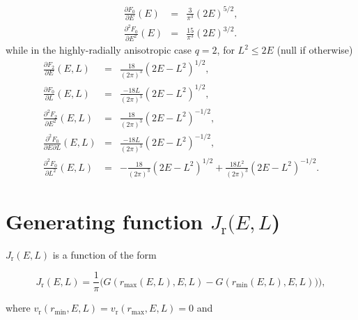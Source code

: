 \documentclass[11pt]{article}
\newcommand{\rr}{\mathrm{r}}
\newcommand{\vr}{v_{\rr}}
\newcommand{\rmax}{r_{\max}}
\newcommand{\rmin}{r_{\min}}
\newcommand{\Jr}{J_{\mathrm{r}}}
\begin{document}
\begin{appendices}
\begin{equation}
  \begin{array}{ccl}
    \displaystyle{\frac{\partial F_{0}}{\partial E}(E)}&=&\displaystyle{\frac{3}{\pi^{3}}(2E)^{5/2}} ,\\

    \displaystyle{\frac{\partial^{2} F_{0}}{\partial E^{2}}(E)} &=& \displaystyle{\frac{15}{\pi^{3}}(2E)^{3/2}} .
    \end{array}
\label{eq:dF0}
\end{equation}
while in the highly-radially anisotropic case $q=2$, for $L^{2} \leq 2E$ (null if otherwise)
\begin{equation}
  \begin{array}{ccl}
    \displaystyle{\frac{\partial F_{2}}{\partial E}(E,L)}&=&\displaystyle{\frac{18}{(2\pi)^{3}}(2E-L^{2})^{1/2}} ,\\

    \displaystyle{\frac{\partial F_{0}}{\partial L}(E,L)} &=& \displaystyle{\frac{-18L}{(2\pi)^{3}}(2E-L^{2})^{1/2}} , \\
  
      \displaystyle{\frac{\partial^{2} F_{2}}{\partial E^{2}}(E,L)}&=&\displaystyle{\frac{18}{(2\pi)^{3}}(2E-L^{2})^{-1/2}} ,\\

      \displaystyle{\frac{\partial^{2} F_{0}}{\partial E \partial L}(E,L)} &=& \displaystyle{\frac{-18L}{(2\pi)^{3}}(2E-L^{2})^{-1/2}} , \\

         \displaystyle{\frac{\partial^{2} F_{0}}{\partial L^{2}}(E,L)} &=& \displaystyle{-\frac{18}{(2\pi)^{3}}(2E-L^{2})^{1/2}+\frac{18L^{2}}{(2\pi)^{3}}(2E-L^{2})^{-1/2}} .
    \end{array}
\label{eq:dF2}
\end{equation}

\section{Generating function $\Jr(E,L$)}
\label{sec:derivatives_Jr}

$\Jr(E,L)$ is a function of the form

\begin{equation}
  \Jr(E,L) = \frac{1}{\pi} \bigg(G(\rmax(E,L),E,L)-G(\rmin(E,L),E,L))\bigg)
  \label{eq:Jr_eq} ,
\end{equation}

where $\vr(\rmin,E,L)=\vr(\rmax,E,L)=0$ and


\end{appendices}
\end{document}
